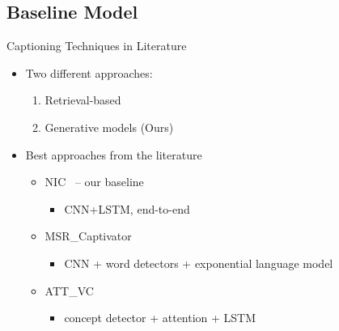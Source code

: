 \documentclass{beamer}
\begin{document}
\subsection{Baseline Model}
\begin{frame}{Captioning Techniques in Literature}
\begin{itemize}
  \item Two different approaches:
      \begin{enumerate}
        \item Retrieval-based 
        \item Generative models (Ours)
      \end{enumerate}
  \item Best approaches from the literature
          \begin{itemize}
  \item NIC~\cite{Vinyals_2015_CVPR} -- our baseline 
      \begin{itemize}
        \item CNN+LSTM, end-to-end 
      \end{itemize}
  \item MSR\_Captivator~\cite{Fang2015}
      \begin{itemize}
        \item CNN + word detectors + exponential language model
      \end{itemize}
  \item ATT\_VC~\cite{you2016image}
      \begin{itemize}
        \item concept detector + attention + LSTM 
      \end{itemize}
\end{itemize} 
\end{itemize} 
\end{frame}
\end{document}
